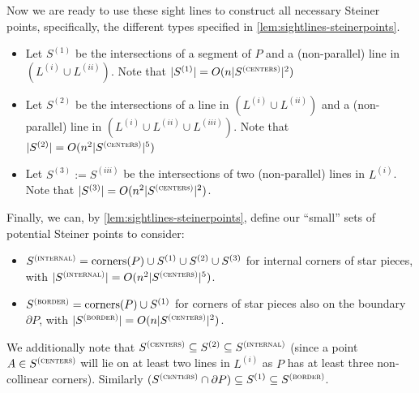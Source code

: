\documentclass[10pt,a4paper]{article}
\newcommand\Scen{S^{\textsc{(centers)}}}
\newcommand\Sint{S^{\textsc{(internal)}}}
\newcommand\Sbor{S^{\textsc{(border)}}}
\begin{document}
Now we are ready to use these sight lines to construct all necessary Steiner points, specifically, the different types specified in \cref{lem:sightlines-steinerpoints}.

\begin{itemize}
\item Let $S^{(1)}$ be the intersections of a segment of $P$ and a (non-parallel) line in $(L^{(i)}\cup L^{(ii)})$.
Note that $|S^{(1)}| = O(n|\Scen|^2)$
\item Let $S^{(2)}$ be the intersections of a line in $(L^{(i)}\cup L^{(ii)})$ and a (non-parallel) line in $(L^{(i)}\cup L^{(ii)}\cup L^{(iii)})$. Note that $|S^{(2)}| = O(n^2|\Scen|^5)$
\item Let $S^{(3)} := S^{(iii)}$ be the intersections of two (non-parallel) lines in $L^{(i)}$. Note that $|S^{(3)}| = O(n^2|\Scen|^2)$.
\end{itemize}

Finally, we can, by \cref{lem:sightlines-steinerpoints}, define our ``small'' sets of potential Steiner points to consider:
\begin{itemize}
    \item $\Sint = \text{corners}(P)\cup S^{(1)}\cup S^{(2)}\cup S^{(3)}$ for internal corners of star pieces, with $|\Sint| = O(n^2|\Scen|^5)$.
    \item $\Sbor = \text{corners}(P)\cup S^{(1)}$ for corners of star pieces also on the boundary $\partial P$, with
    $|\Sbor| = O(n|\Scen|^2)$.
\end{itemize}
We additionally note that $\Scen\subseteq S^{(2)}\subseteq \Sint$ (since a point $A\in \Scen$ will lie on at least two lines in $L^{(i)}$ as $P$ has at least three non-collinear corners). Similarly $(\Scen\cap \partial P)\subseteq S^{(1)}\subseteq \Sbor$.
\end{document}
